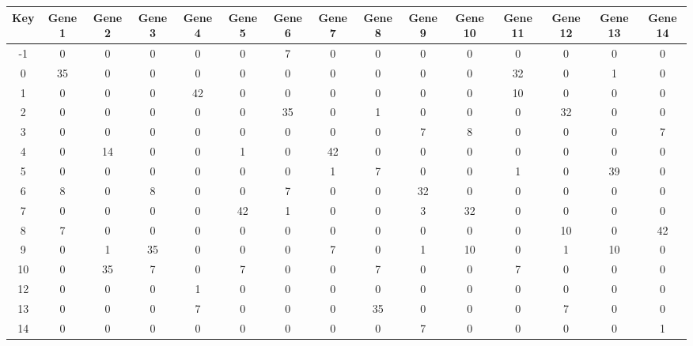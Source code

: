 \begin{tabular}{|c|c|c|c|c|c|c|c|c|c|c|c|c|c|c|}
\hline
Key & Gene 1 & Gene 2 & Gene 3 & Gene 4 & Gene 5 & Gene 6 & Gene 7 & Gene 8 & Gene 9 & Gene 10 & Gene 11 & Gene 12 & Gene 13 & Gene 14 \\
\hline
-1 & 0 & 0 & 0 & 0 & 0 & 7 & 0 & 0 & 0 & 0 & 0 & 0 & 0 & 0 \\
0 & 35 & 0 & 0 & 0 & 0 & 0 & 0 & 0 & 0 & 0 & 32 & 0 & 1 & 0 \\
1 & 0 & 0 & 0 & 42 & 0 & 0 & 0 & 0 & 0 & 0 & 10 & 0 & 0 & 0 \\
2 & 0 & 0 & 0 & 0 & 0 & 35 & 0 & 1 & 0 & 0 & 0 & 32 & 0 & 0 \\
3 & 0 & 0 & 0 & 0 & 0 & 0 & 0 & 0 & 7 & 8 & 0 & 0 & 0 & 7 \\
4 & 0 & 14 & 0 & 0 & 1 & 0 & 42 & 0 & 0 & 0 & 0 & 0 & 0 & 0 \\
5 & 0 & 0 & 0 & 0 & 0 & 0 & 1 & 7 & 0 & 0 & 1 & 0 & 39 & 0 \\
6 & 8 & 0 & 8 & 0 & 0 & 7 & 0 & 0 & 32 & 0 & 0 & 0 & 0 & 0 \\
7 & 0 & 0 & 0 & 0 & 42 & 1 & 0 & 0 & 3 & 32 & 0 & 0 & 0 & 0 \\
8 & 7 & 0 & 0 & 0 & 0 & 0 & 0 & 0 & 0 & 0 & 0 & 10 & 0 & 42 \\
9 & 0 & 1 & 35 & 0 & 0 & 0 & 7 & 0 & 1 & 10 & 0 & 1 & 10 & 0 \\
10 & 0 & 35 & 7 & 0 & 7 & 0 & 0 & 7 & 0 & 0 & 7 & 0 & 0 & 0 \\
12 & 0 & 0 & 0 & 1 & 0 & 0 & 0 & 0 & 0 & 0 & 0 & 0 & 0 & 0 \\
13 & 0 & 0 & 0 & 7 & 0 & 0 & 0 & 35 & 0 & 0 & 0 & 7 & 0 & 0 \\
14 & 0 & 0 & 0 & 0 & 0 & 0 & 0 & 0 & 7 & 0 & 0 & 0 & 0 & 1 \\
\hline
\end{tabular}